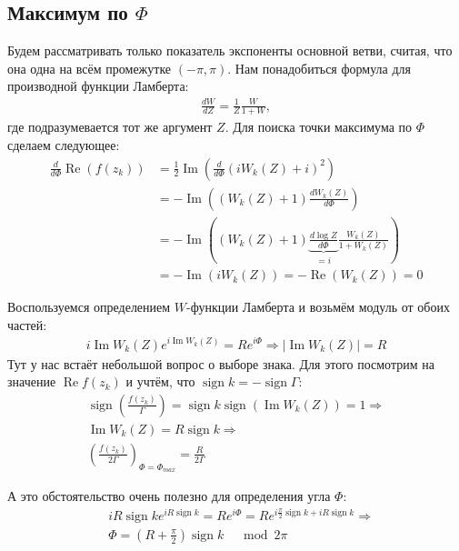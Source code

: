\documentclass[a4paper, 12pt]{article}
\DeclareMathOperator*{\sign}{sign}
\DeclareMathOperator*{\Real}{Re}
\DeclareMathOperator*{\Imag}{Im}
\begin{document}
\subsection*{Максимум по $\Phi$}
Будем рассматривать только показатель экспоненты основной ветви, считая, что она одна на всём промежутке $(-\pi, \pi)$.
Нам понадобиться формула для производной функции Ламберта:
\begin{equation}
\begin{aligned}
    \frac{dW}{dZ} = \frac{1}{Z}\frac{W}{1+W},
\end{aligned}
\end{equation}
где подразумевается тот же аргумент $Z$.
Для поиска точки максимума по $\Phi$ сделаем следующее:
\begin{equation}
\begin{aligned}
    \frac{d}{d\Phi}\Real\left(f(z_k)\right) &= 
    \frac{1}{2}\Imag\left(\frac{d}{d\Phi} (iW_k(Z) + i)^2\right) \\
    &= -\Imag\left((W_k(Z) + 1)\frac{dW_k(Z)}{d\Phi}\right)\\
    &= -\Imag\left((W_k(Z) + 1) \underbrace{\frac{d\log Z}{d\Phi}}_{=i} \frac{W_k(Z)}{1+W_k(Z)} \right)\\
    &= -\Imag\left(i W_k(Z)\right) = -\Real(W_k(Z)) = 0
\end{aligned}
\end{equation}

Воспользуемся определением $W$-функции Ламберта и возьмём модуль от обоих частей:
\begin{equation}
\begin{aligned}
    i\Imag W_k(Z)e^{i\Imag W_k(Z)} = R e^{i\Phi} \Rightarrow \left|\Imag W_k(Z)\right| = R
\end{aligned}
\end{equation}
Тут у нас встаёт небольшой вопрос о выборе знака. Для этого посмотрим на значение $\Real f(z_k)$ и учтём, что $\sign k = -\sign \Gamma$:
\begin{equation}
\begin{aligned}
    \sign\left(\frac{f(z_k)}{\Gamma}\right) = \sign k \sign\left(\Imag W_k(Z)\right) = 1 \Rightarrow \\\Imag W_k(Z) = R\sign k \Rightarrow \\
    \left(\frac{f(z_k)}{2\Gamma}\right)_{\Phi = \Phi_{max}} = \frac{R}{2\Gamma}
\end{aligned}
\end{equation}



А это обстоятельство очень полезно для определения угла $\Phi$:
\begin{equation}
\begin{aligned}
    &i R \sign k  e^{i R \sign k } = R e^{i\Phi} = R e^{i\frac{\pi}{2}\sign k + i R \sign k} \Rightarrow \\ 
    &\Phi = \left(R+\frac{\pi}{2}\right)\sign k \;\;\; \mod 2\pi
\end{aligned}
\end{equation}
\end{document}
